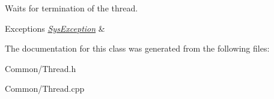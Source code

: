 Waits for termination of the thread. 


\begin{DoxyExceptions}{Exceptions}
{\em \hyperlink{class_common_1_1_sys_exception}{Sys\-Exception}} & \\
\hline
\end{DoxyExceptions}


The documentation for this class was generated from the following files\-:\begin{DoxyCompactItemize}
\item 
Common/Thread.\-h\item 
Common/Thread.\-cpp\end{DoxyCompactItemize}
